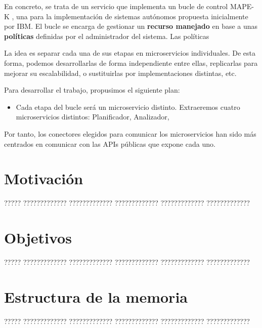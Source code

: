 En concreto, se trata de un servicio que implementa un bucle de control MAPE-K \cite{ibmcorporationArchitecturalBlueprintAutonomic2006, fonsServiciosAdaptivereadyPara2021}, una para la implementación de sistemas autónomos propuesta inicialmente por IBM. El bucle se encarga de gestionar un \textbf{recurso manejado} en base a unas \textbf{políticas} definidas por el administrador del sistema. Las políticas


La idea es separar cada una de sus etapas en microservicios individuales. De esta forma, podemos desarrollarlas de forma independiente entre ellas, replicarlas para mejorar su escalabilidad, o sustituirlas por implementaciones distintas, etc.

Para desarrollar el trabajo, propusimos el siguiente plan:
\begin{itemize}
  \item Cada etapa del bucle será un microservicio distinto. Extraeremos cuatro microservicios distintos: Planificador, Analizador,
\end{itemize}

Por tanto, los conectores elegidos para comunicar los microservicios han sido más centrados en comunicar con las APIs públicas que expone cada uno.

\section{Motivación}

????? ????????????? ????????????? ????????????? ????????????? ?????????????

\section{Objetivos}

????? ????????????? ????????????? ????????????? ????????????? ?????????????

\section{Estructura de la memoria}

????? ????????????? ????????????? ????????????? ????????????? ?????????????



